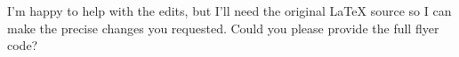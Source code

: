 I’m happy to help with the edits, but I’ll need the original LaTeX source so I can make the precise changes you requested. Could you please provide the full flyer code?